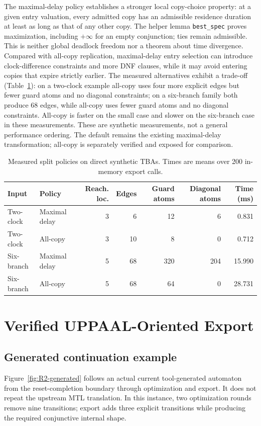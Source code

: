 \documentclass{ieeeaccess}
\begin{document}
The maximal-delay policy establishes a stronger local copy-choice property:
at a given entry valuation, every admitted copy has an admissible residence
duration at least as long as that of any other copy. The helper lemma
\texttt{best\_spec} proves maximization, including $+\infty$ for an empty
conjunction; ties remain admissible. This is neither global deadlock
freedom nor a theorem about time divergence. Compared with all-copy
replication, maximal-delay entry selection can introduce clock-difference
constraints and more DNF clauses, while it may avoid entering copies that
expire strictly earlier. The measured alternatives exhibit a trade-off
(Table~\ref{tab:split-comparison}): on a two-clock example all-copy uses four
more explicit edges but fewer guard atoms and no diagonal constraints; on a
six-branch family both produce 68 edges, while all-copy uses fewer guard
atoms and no diagonal constraints. All-copy is faster on the small case and
slower on the six-branch case in these measurements. These are synthetic
measurements, not a general performance ordering. The default remains the existing
maximal-delay transformation; all-copy is separately verified and exposed
for comparison.

\begin{table}[t]
\centering
\caption{Measured split policies on direct synthetic TBAs. Times are means
over 200 in-memory export calls.}
\label{tab:split-comparison}
\scriptsize
\begin{tabular}{@{}llrrrrr@{}}
\toprule
Input & Policy & Reach. loc. & Edges & Guard atoms & Diagonal atoms & Time (ms)\\
\midrule
Two-clock & Maximal delay & 3 & 6 & 12 & 6 & 0.831\\
Two-clock & All-copy & 3 & 10 & 8 & 0 & 0.712\\
Six-branch & Maximal delay & 5 & 68 & 320 & 204 & 15.990\\
Six-branch & All-copy & 5 & 68 & 64 & 0 & 28.731\\
\bottomrule
\end{tabular}
\end{table}

\section{Verified UPPAAL-Oriented Export}
\label{sec:export}
\subsection{Generated continuation example}
Figure~\ref{fig:R2-generated} follows an actual current tool-generated automaton from the reset-completion boundary through optimization and export. It does not repeat the upstream MTL translation. In this instance, two optimization rounds remove nine transitions; export adds three explicit transitions while producing the required conjunctive internal shape.
\end{document}
